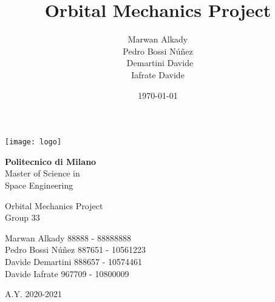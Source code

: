 \documentclass[11pt,a4paper]{report}
\title{Orbital Mechanics Project}
\author{Marwan Alkady\\ Pedro Bossi N\'{u}\~{n}ez \\\ Demartini Davide\\ Iafrate Davide\\}
\date{\today}
\begin{document}
\begin{titlepage}
	\clearpage\thispagestyle{empty}
	\centering


   \centering \texttt{[image: logo]}

   \vspace{0.5cm}

	{\Huge\textbf{Politecnico di Milano} \\
Master of Science in\\ Space Engineering \\
		 \par}
		\vspace{3cm}
	{\Huge{Orbital Mechanics Project}} \\
	\vspace{3cm}
	{\huge Group 33\\}
	\vspace{0.4cm}
	{\LARGE Marwan Alkady 88888 - 88888888\\ Pedro Bossi N\'{u}\~{n}ez 887651 - 10561223\\ Davide Demartini 888657 - 10574461\\ Davide Iafrate 967709 - 10800009\\ \par}

\vspace{1cm}
	{\Large A.Y. 2020-2021 \par}

	\pagebreak

\end{titlepage}

{}

\printnomenclature
\tableofcontents

\end{document}
